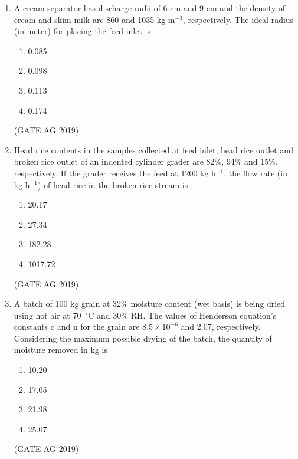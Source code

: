 \documentclass[journal,12pt,onecolumn]{IEEEtran}
\theoremstyle{remark}
\begin{document}
\begin{enumerate}
\item 
A cream separator has discharge radii of 6 cm and 9 cm and the density of cream and skim milk are 860 and 1035 kg m$^{-3}$, respectively. The ideal radius (in meter) for placing the feed inlet is  
\begin{multicols}{4}
\begin{enumerate}
\item 0.085
\item 0.098
\item 0.113
\item 0.174
\end{enumerate}
\end{multicols}
\hfill{(GATE AG 2019)}

\item 
Head rice contents in the samples collected at feed inlet, head rice outlet and broken rice outlet of an indented cylinder grader are 82\%, 94\% and 15\%, respectively. If the grader receives the feed at 1200 kg h$^{-1}$, the flow rate (in kg h$^{-1}$) of head rice in the broken rice stream is  
\begin{multicols}{4}
\begin{enumerate}
\item 20.17
\item 27.34
\item 182.28
\item 1017.72
\end{enumerate}
\end{multicols}
\hfill{(GATE AG 2019)}

\item 
A batch of 100 kg grain at 32\% moisture content (wet basis) is being dried using hot air at 70~$^\circ$C and 30\% RH. The values of Henderson equation's constants c and n for the grain are $8.5\times 10^{-6}$ and 2.07, respectively. Considering the maximum possible drying of the batch, the quantity of moisture removed in kg is  
\begin{multicols}{4}
\begin{enumerate}
\item 10.20
\item 17.05
\item 21.98
\item 25.07
\end{enumerate}
\end{multicols}
\hfill{(GATE AG 2019)}


\end{enumerate}
\end{document}
